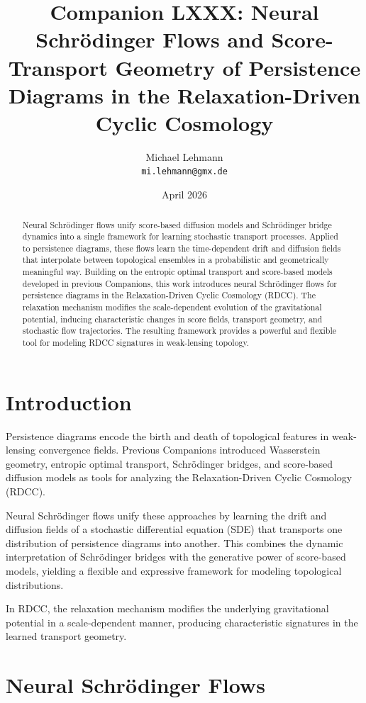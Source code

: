 \documentclass[11pt,a4paper]{article}
\title{\textbf{Companion LXXX: Neural Schrödinger Flows and Score-Transport Geometry of Persistence Diagrams in the Relaxation-Driven Cyclic Cosmology}}
\author{Michael Lehmann \\ \texttt{mi.lehmann@gmx.de}}
\date{April 2026}
\begin{document}
\maketitle

\begin{abstract}
Neural Schrödinger flows unify score-based diffusion models and Schrödinger bridge 
dynamics into a single framework for learning stochastic transport processes. 
Applied to persistence diagrams, these flows learn the time-dependent drift and 
diffusion fields that interpolate between topological ensembles in a probabilistic 
and geometrically meaningful way. Building on the entropic optimal transport and 
score-based models developed in previous Companions, this work introduces neural 
Schrödinger flows for persistence diagrams in the Relaxation-Driven Cyclic 
Cosmology (RDCC). The relaxation mechanism modifies the scale-dependent evolution 
of the gravitational potential, inducing characteristic changes in score fields, 
transport geometry, and stochastic flow trajectories. The resulting framework 
provides a powerful and flexible tool for modeling RDCC signatures in weak-lensing 
topology.
\end{abstract}
\section{Introduction}

Persistence diagrams encode the birth and death of topological features in weak-
lensing convergence fields. Previous Companions introduced Wasserstein geometry, 
entropic optimal transport, Schrödinger bridges, and score-based diffusion models 
as tools for analyzing the Relaxation-Driven Cyclic Cosmology (RDCC).

Neural Schrödinger flows unify these approaches by learning the drift and 
diffusion fields of a stochastic differential equation (SDE) that transports one 
distribution of persistence diagrams into another. This combines the dynamic 
interpretation of Schrödinger bridges with the generative power of score-based 
models, yielding a flexible and expressive framework for modeling topological 
distributions.

In RDCC, the relaxation mechanism modifies the underlying gravitational potential 
in a scale-dependent manner, producing characteristic signatures in the learned 
transport geometry.
\section{Neural Schrödinger Flows}
\end{document}
